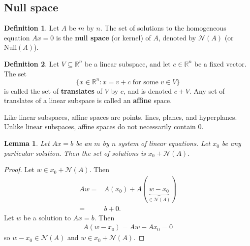 \documentclass[12pt,reqno]{amsart}
\newtheorem{lemma}{Lemma}[section]
\theoremstyle{definition}
\newtheorem{definition}{Definition}[section]
\def\R{\mathbb{R}}
\begin{document}
\subsection{Null space}
\begin{definition}
  Let $A$ be $m$ by $n$. The set of solutions to the homogeneous
  equation $Ax = 0$ is the \textbf{null space} (or kernel) of
  $A$, denoted by $\mathcal{N}(A)$ (or $\mathrm{Null}(A)$).
\end{definition}

\begin{definition}
  Let $V \subseteq \R^n$ be a linear subspace, and let $c \in \R^n$ be
  a fixed vector. The set
  \[ \{ x \in \R^n: x = v + c \text{ for some } v \in V \} \]
  is called the set of \textbf{translates} of $V$ by $c$, and is
  denoted $c + V$. Any set of
  translates of a linear subspace is called an \textbf{affine} space. 
\end{definition}
Like linear subspaces, affine spaces are points, lines, planes, and
hyperplanes. Unlike linear subspaces, affine spaces do not necessarily
contain 0. 

\begin{lemma}
  Let $A x = b$ be an $m$ by $n$ system of linear equations. Let $x_0$
  be any particular solution. Then the set of solutions is $x_0 +
  \mathcal{N}(A)$. 
\end{lemma}
\begin{proof}
  Let $w \in x_0 + \mathcal{N}(A)$. Then 
  \begin{align*}
    Aw = & A(x_0) + A(\underbrace{w-x_0}_{\in \mathcal{N}(A)}) \\
    = & b + 0.
  \end{align*}
  Let $w$ be a solution to $Ax = b$. Then
  \begin{align*}
    A(w - x_0) = Aw - Ax_0 = 0
  \end{align*}
  so $w - x_0 \in \mathcal{N}(A)$ and $w \in x_0 + \mathcal{N}(A)$. 
\end{proof}
\end{document}
